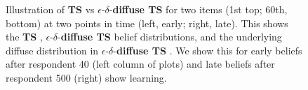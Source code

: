 \documentclass[a4paper,12pt]{article}
\newcommand{\ts}{\textbf{TS} }
\newcommand{\edts}{$\epsilon$-$\delta$-\textbf{diffuse TS} }
\begin{document}
\begin{figure}
\caption{ Illustration of \ts vs \edts for two items (1st top; 60th, bottom) at two points in time (left, early; right, late). This shows the \ts, \edts belief distributions, and the underlying diffuse distribution in \edts. We show this for early beliefs after respondent 40 (left column of plots) and late beliefs after respondent 500 (right) show learning. }
\label{fig:illustrating_edts}
 	\begin{center}
    \qquad
    \qquad
    \qquad
    \end{center}
\end{figure}
\end{document}
